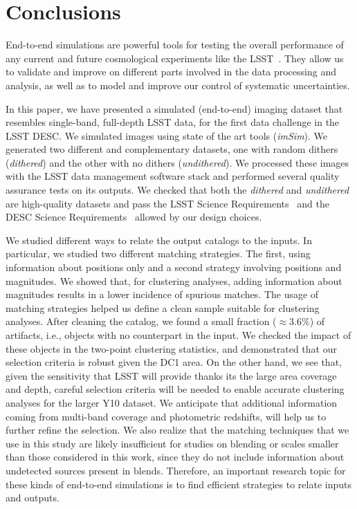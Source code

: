 \documentclass[twocolumn]{aastex62}
\begin{document}

\section{Conclusions}
\label{sec:conclusions}

End-to-end simulations are powerful tools for testing the overall performance of any current and future cosmological experiments like the LSST~\citep{Overview}. They allow us to validate and improve on different parts involved in the data processing and analysis, as well as to model and improve our control of systematic uncertainties.

In this paper, we have presented a simulated (end-to-end) imaging dataset that resembles single-band, full-depth LSST data, for the first data challenge in the LSST DESC. We simulated images using state of the art tools (\textit{imSim}). We generated two different and complementary datasets, one with random dithers (\textit{dithered}) and the other with no dithers (\textit{undithered}). We processed these images with the LSST data management software stack and performed several quality assurance tests on its outputs. We checked that both the \textit{dithered} and \textit{undithered} are high-quality datasets and pass the LSST Science Requirements~\citep{LPM-17} and the DESC Science Requirements~\citep{2018arXiv180901669T} allowed by our design choices. 

We studied different ways to relate the output catalogs to the inputs. In particular, we studied two different matching strategies. The first, using information about positions only and a second strategy involving positions and magnitudes. We showed that, for clustering analyses, adding information about magnitudes results in a lower incidence of spurious matches. The usage of matching strategies helped us define a clean sample suitable for clustering analyses. After cleaning the catalog, we found a small fraction ($\approx 3.6\%$) of artifacts, i.e., objects with no counterpart in the input. We checked the impact of these objects in the two-point clustering statistics, and demonstrated that our selection criteria is robust given the DC1 area. On the other hand, we see that, given the sensitivity that LSST will provide thanks its the large area coverage and depth, careful selection criteria will be needed to enable accurate clustering analyses for the larger Y10 dataset. We anticipate that additional information coming from multi-band coverage and photometric redshifts, will help us to further refine the selection. We also realize that the matching techniques that we use in this study are likely insufficient for studies on blending or scales smaller than those considered in this work, since they do not include information about undetected sources present in blends. Therefore, an important research topic for these kinds of end-to-end simulations is to find efficient strategies to relate inputs and outputs.
\end{document}
